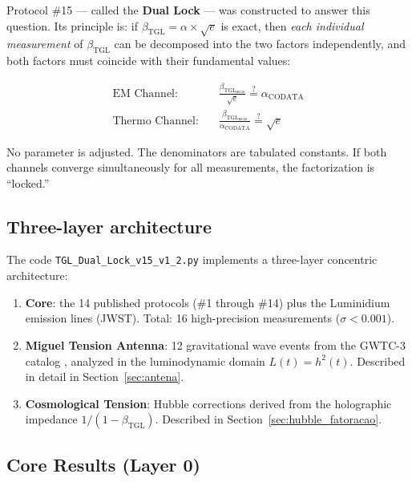 \documentclass[12pt,a4paper,twoside]{article}
\newcommand{\betatgl}{\beta_{\!\scriptscriptstyle\mathrm{TGL}}}
\newcommand{\code}[1]{\texttt{#1}}
\begin{document}
Protocol \#15 \cite{Miguel2026Protocol15} --- called the \textbf{Dual Lock} --- was constructed to answer this question. Its principle is: if $\betatgl = \alpha \times \sqrt{e}$ is exact, then \textit{each individual measurement} of $\betatgl$ can be decomposed into the two factors independently, and both factors must coincide with their fundamental values:
%
\begin{equationbox}[title={The Dual Lock}]
\begin{align}
\text{EM Channel:} \quad & \frac{\betatgl_{\text{meas}}}{\sqrt{e}} \stackrel{?}{=} \alpha_{\text{CODATA}} \label{eq:canal_em} \\[6pt]
\text{Thermo Channel:} \quad & \frac{\betatgl_{\text{meas}}}{\alpha_{\text{CODATA}}} \stackrel{?}{=} \sqrt{e} \label{eq:canal_thermo}
\end{align}
\end{equationbox}
%
No parameter is adjusted. The denominators are tabulated constants. If both channels converge simultaneously for all measurements, the factorization is ``locked.''


\subsection{Three-layer architecture}

The code \code{TGL\_Dual\_Lock\_v15\_v1\_2.py} \cite{Miguel2026Protocol15} implements a three-layer concentric architecture:

\begin{enumerate}[label=\textbf{Layer \arabic*},nosep,leftmargin=*]
\item[\textbf{Layer 0}] \textbf{Core}: the 14 published protocols (\#1 through \#14) plus the Luminidium emission lines (JWST). Total: 16 high-precision measurements ($\sigma < 0.001$).

\item[\textbf{Layer 1}] \textbf{Miguel Tension Antenna}: 12 gravitational wave events from the GWTC-3 catalog \cite{GWTC3}, analyzed in the luminodynamic domain $L(t) = h^2(t)$. Described in detail in Section~\ref{sec:antena}.

\item[\textbf{Layer 2}] \textbf{Cosmological Tension}: Hubble corrections derived from the holographic impedance $1/(1 - \betatgl)$. Described in Section~\ref{sec:hubble_fatoracao}.
\end{enumerate}


\subsection{Core Results (Layer 0)}
\label{subsec:core_results}
\end{document}
